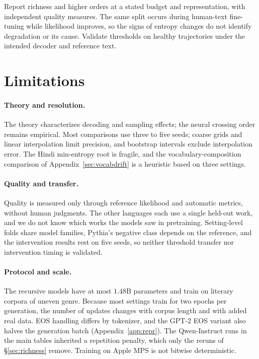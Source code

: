 \documentclass[10pt]{article}
\theoremstyle{plain}
\theoremstyle{definition}
\begin{document}
Report richness and higher orders at a stated budget and representation, with independent
quality measures. The same split occurs during human-text fine-tuning while likelihood improves,
so the signs of entropy changes do not identify degradation or its cause. Validate thresholds on healthy trajectories
under the intended decoder and reference text.

\section*{Limitations}

\paragraph{Theory and resolution.} The theory characterizes decoding and sampling effects;
the neural crossing order remains empirical. Most comparisons use three to five seeds;
coarse grids and linear interpolation limit precision, and bootstrap intervals exclude interpolation error. The Hindi
min-entropy root is fragile, and the vocabulary-composition comparison of
Appendix~\ref{sec:vocabdrift} is a heuristic based on three settings.

\paragraph{Quality and transfer.} Quality is measured only through reference likelihood and
automatic metrics, without human judgments. The other languages each use a single held-out work,
and we do not know which works the models saw in pretraining. Setting-level folds share model
families, Pythia's negative class depends on the reference, and the intervention results rest on
five seeds, so neither threshold transfer nor intervention timing is validated.

\paragraph{Protocol and scale.} The recursive models have at most $1.48$B parameters and train on
literary corpora of uneven genre. Because most settings train for two epochs per generation, the
number of updates changes with corpus length and with added real data. EOS handling differs by tokenizer,
and the GPT-2 EOS variant also halves the generation batch (Appendix~\ref{app:repr}). The
Qwen-Instruct runs in the main tables inherited a repetition penalty, which only the reruns of
\S\ref{sec:richness} remove. Training on Apple MPS is not bitwise deterministic.
\end{document}
